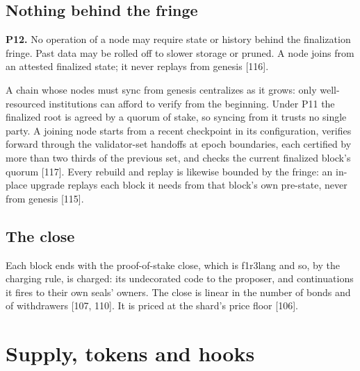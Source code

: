 \documentclass[10.5pt]{article}
\newcommand{\D}[1]{{\color{muted}\small[#1]}}
\begin{document}
\subsection{Nothing behind the fringe}

\begin{keypoint}
\textbf{P12.} No operation of a node may require state or history behind the finalization fringe. Past data may be rolled off to slower storage or pruned. A node joins from an attested finalized state; it never replays from genesis \D{116}.
\end{keypoint}

A chain whose nodes must sync from genesis centralizes as it grows: only well-resourced institutions can afford to verify from the beginning. Under P11 the finalized root is agreed by a quorum of stake, so syncing from it trusts no single party. A joining node starts from a recent checkpoint in its configuration, verifies forward through the validator-set handoffs at epoch boundaries, each certified by more than two thirds of the previous set, and checks the current finalized block's quorum \D{117}. Every rebuild and replay is likewise bounded by the fringe: an in-place upgrade replays each block it needs from that block's own pre-state, never from genesis \D{115}.

\subsection{The close}

Each block ends with the proof-of-stake close, which is f1r3lang and so, by the charging rule, is charged: its undecorated code to the proposer, and continuations it fires to their own seals' owners. The close is linear in the number of bonds and of withdrawers \D{107, 110}. It is priced at the shard's price floor \D{106}.

\section{Supply, tokens and hooks}\label{sec:supply}
\end{document}
